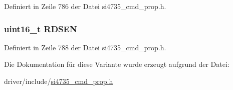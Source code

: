 Definiert in Zeile 786 der Datei si4735\+\_\+cmd\+\_\+prop.\+h.

\hypertarget{unionfm__rds__config_ad71a7ca46176641616c4938efc2778ed}{}
\subsubsection[{R\+D\+S\+E\+N}]{\setlength{\rightskip}{0pt plus 5cm}uint16\+\_\+t R\+D\+S\+E\+N}\label{unionfm__rds__config_ad71a7ca46176641616c4938efc2778ed}


Definiert in Zeile 788 der Datei si4735\+\_\+cmd\+\_\+prop.\+h.



Die Dokumentation für diese Variante wurde erzeugt aufgrund der Datei\+:\begin{DoxyCompactItemize}
\item 
driver/include/\hyperlink{si4735__cmd__prop_8h}{si4735\+\_\+cmd\+\_\+prop.\+h}\end{DoxyCompactItemize}

